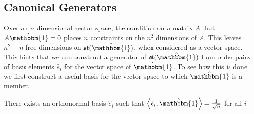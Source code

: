\subsection{Canonical Generators}
Over an $n$ dimensional vector space, the condition on a matrix $A$ that $A \hat{\mathbbm{1}} = 0$
places $n$ constraints on the $n^2$ dimensions of $A$. This leaves $n^2 - n$ free dimensions
on $\mathfrak{st}(\hat{\mathbbm{1}})$, when considered as a vector space. This hints that we
can construct a generator of $\mathfrak{st}(\hat{\mathbbm{1}})$ from order pairs of basis
elements $\hat{e}_i$ for the vector space of $\hat{\mathbbm{1}}$. To see how this is done we
first construct a useful basis for the vector space to which $\hat{\mathbbm{1}}$ is a
member.
\begin{lemma}
	There exists an orthonormal basis $\hat{e}_i$ such that $\left\langle \hat{e}_i, \hat{\mathbbm{1}} \right\rangle = \frac{1}{\sqrt{n}}$
	for all $i$
\end{lemma}
